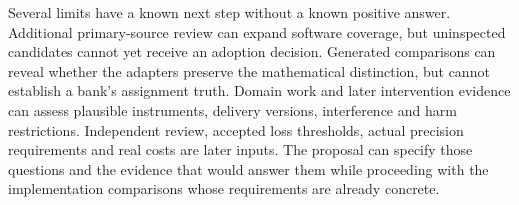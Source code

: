 Several limits have a known next step without a
known positive answer. Additional primary-source
review can expand software coverage, but uninspected
candidates cannot yet receive an adoption decision.
Generated comparisons can reveal whether the
adapters preserve the mathematical distinction,
but cannot establish a bank's assignment truth.
Domain work and later intervention evidence can
assess plausible instruments, delivery versions,
interference and harm restrictions. Independent
review, accepted loss thresholds, actual precision
requirements and real costs are later inputs.
The proposal can specify those questions and the
evidence that would answer them while proceeding
with the implementation comparisons whose
requirements are already concrete.
\label{exec17:s3-end}
